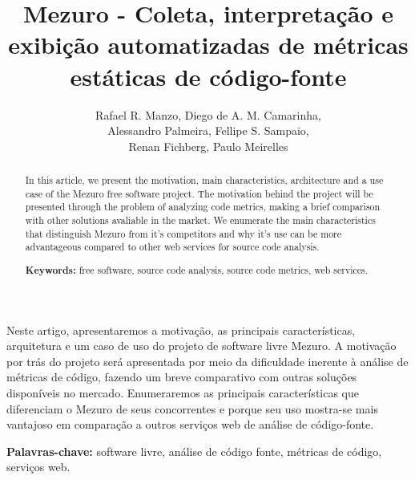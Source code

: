 \documentclass[12pt]{article}
\begin{document}
\sloppy
\title{Mezuro - Coleta, interpretação e exibição automatizadas de métricas estáticas de código-fonte}

\author{Rafael R. Manzo, Diego de A. M. Camarinha,\\
        Alessandro Palmeira, Fellipe S. Sampaio,\\
        Renan Fichberg, Paulo Meirelles}

\address{Instituto de Matemática e Estatística -- Universidade de São Paulo (USP)\\
  Rua do Matão, 1010 -- 05508-090 -- Cidade Universitária -- São Paulo -- SP -- Brasil
\nextinstitute
  Faculdade de Engenharia -- UnB Gama (FGA)\\
  Gama -- DF -- Brasil
}

\maketitle
\begin{abstract}
  In this article, we present the motivation, main characteristics, architecture and a use case of the Mezuro free software project. The motivation behind the project will be presented through the problem of analyzing code metrics, making a brief comparison with other solutions avaliable in the market. We enumerate the main characteristics that distinguish Mezuro from it's competitors and why it's use can be more advantageous compared to other web services for source code analysis.

  \textbf{Keywords:} free software, source code analysis, source code metrics, web services.
\end{abstract}

\begin{resumo}
  Neste artigo, apresentaremos a motivação, as principais características, arquitetura e um caso de uso do projeto de software livre Mezuro. A motivação por trás do projeto será apresentada por meio da dificuldade inerente à análise de métricas de código, fazendo um breve comparativo com outras soluções disponíveis no mercado. Enumeraremos as principais características que diferenciam o Mezuro de seus concorrentes e porque seu uso mostra-se mais vantajoso em comparação a outros serviços web de análise de código-fonte.

  \textbf{Palavras-chave:} software livre, análise de código fonte, métricas de código, serviços web.
\end{resumo}
\end{document}
